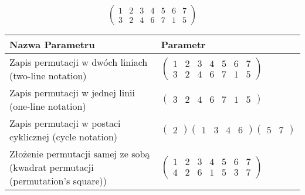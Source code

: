 \documentclass[12pt]{article}
\begin{document}
\subsection{}
\begin{center}
\[
\begin{pmatrix}
	1 & 2 & 3 & 4 & 5 & 6 & 7 \\ 
	3 & 2 & 4 & 6 & 7 & 1 & 5 
\end{pmatrix}
\]

\begin{tabular}{|m{0.6\linewidth}|m{0.4\linewidth}|}
	\hline
	Nazwa Parametru & Parametr \\
	\hline
	Zapis permutacji w dwóch liniach (two-line notation) & $\begin{pmatrix} 1 & 2 & 3 & 4 & 5 & 6 & 7 \\ 
3 & 2 & 4 & 6 & 7 & 1 & 5 \end{pmatrix}$ \\ 
	\hline
	Zapis permutacji w jednej linii (one-line notation) & $\begin{pmatrix} 3 & 2 & 4 & 6 & 7 & 1 & 5 \end{pmatrix}$ \\ 
	\hline
	Zapis permutacji w postaci cyklicznej (cycle notation) & $\begin{pmatrix} 2 \end{pmatrix} \begin{pmatrix} 1 & 3 & 4 & 6 \end{pmatrix} \begin{pmatrix} 5 & 7 \end{pmatrix} $ \\ 
	\hline
	Złożenie permutacji samej ze sobą (kwadrat permutacji (permutation's square)) & $\begin{pmatrix} 1 & 2 & 3 & 4 & 5 & 6 & 7 \\ 
4 & 2 & 6 & 1 & 5 & 3 & 7 \end{pmatrix}$ \\ 
	\hline
\end{tabular}
\end{center}
\end{document}
